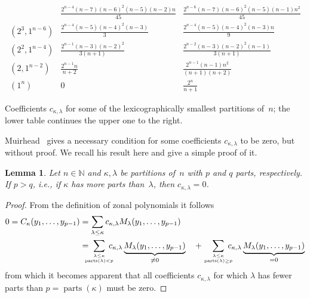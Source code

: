 \documentclass[10pt,oneside,american]{amsart}
\numberwithin{equation}{section}
\numberwithin{figure}{section}
\theoremstyle{plain}
\theoremstyle{definition}
\theoremstyle{remark}
\theoremstyle{plain}
\theoremstyle{definition}
\theoremstyle{plain}
\newtheorem{lemma}[thm]{Lemma}
\theoremstyle{plain}
\begin{document}
\begin{table}
\[\begin{array}{c|cc}
    & \frac{2^{n-4} (n-7) (n-6)^2 (n-5) (n-2) n}{45}
    & \frac{2^{n-6} (n-7) (n-6)^2 (n-5) (n-1) n^2}{45}
    \\[1ex]
    (2^3,1^{n-6})
    & \frac{2^{n-4} (n-5) (n-4)^2 (n-3)}{3}
    & \frac{2^{n-4} (n-5) (n-4)^2 (n-3) n}{9}
    \\[1ex]
    (2^2,1^{n-4})
    & \frac{2^{n-1} (n-3) (n-2)^2}{3 (n+1)}
    & \frac{2^{n-2} (n-3) (n-2)^2 (n-1)}{3 (n+1)}
    \\[1ex]
    (2,1^{n-2})
    & \frac{2^{n-1} n}{n+2}
    & \frac{2^{n-1} (n-1) n^2}{(n+1) (n+2)}
    \\[1ex]
    (1^n)
    & 0 & \frac{2^n}{n+1}
\end{array}
\]
\caption{Coefficients $c_{\kappa,\lambda}$ for some of the lexicographically
  smallest partitions of~$n$; the lower table continues the upper one to the
  right.}
\label{tab:cn2}
\end{table}

Muirhead~\cite[Lemma~7.2.3]{Muirhead} gives a necessary condition for some
coefficients $c_{\kappa,\lambda}$ to be zero, but without proof. We recall his
result here and give a simple proof of it.
\begin{lemma}\label{lem:zero1}
  Let $n\in\mathbb{N}$ and $\kappa,\lambda$ be partitions of~$n$ with $p$ and
  $q$ parts, respectively. If $p>q$, i.e., if $\kappa$ has more parts
  than~$\lambda$, then $c_{\kappa,\lambda}=0$.
\end{lemma}
\begin{proof}
  From the definition of zonal polynomials it follows
  \begin{align*}
    0 = C_{\kappa}(y_1,\dots,y_{p-1}) &=
    \sum_{\lambda\leq\kappa} c_{\kappa,\lambda} M_{\lambda}(y_1,\dots,y_{p-1}) \\
    &= \!\!\!\!\!\sum_{\genfrac{}{}{0pt}{}{\lambda\leq\kappa}{\operatorname{parts}(\lambda)<p}}\!\!\!\!\!
      c_{\kappa,\lambda} \underbrace{M_{\lambda}(y_1,\dots,y_{p-1})}_{\neq0} \quad +
    \sum_{\genfrac{}{}{0pt}{}{\lambda\leq\kappa}{\operatorname{parts}(\lambda)\geq p}}\!\!\!\!\!
      c_{\kappa,\lambda} \underbrace{M_{\lambda}(y_1,\dots,y_{p-1})}_{=0}
  \end{align*}
  from which it becomes apparent that all coefficients $c_{\kappa,\lambda}$
  for which $\lambda$ has fewer parts than $p=\operatorname{parts}(\kappa)$
  must be zero.
\end{proof}
\end{document}

